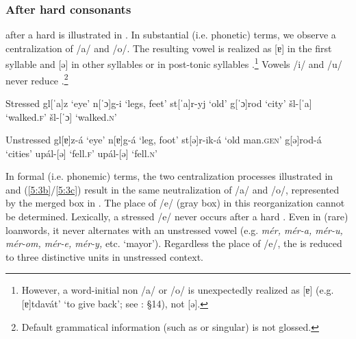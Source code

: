 \documentclass[output=paper,modfonts,newtxmath,hidelinks,]{langscibook}
\begin{document}
\subsubsection{After hard consonants}\label{5:s2.1.1}

  after a hard  is illustrated in . In substantial (i.e. phonetic) terms, we observe a centralization of /a/ and /o/. The resulting vowel is realized as [ɐ] in the first  syllable  and [ə] in other  syllables  or in post-tonic syllables .\footnote{However, a word-initial non  /a/ or /o/ is unexpectedly realized as [ɐ] (e.g. [ɐ]tdavát’ ‘to give back’; see \citealt{Avanesov1968}: §14), not [ə].} Vowels /i/ and /u/ never reduce \citep[38--42]{Avanesov1968}.\footnote{Default grammatical information (such as  or singular) is not glossed.}\vspace{-\baselineskip}

\ea\label{5:3}\begin{multicols}{2}
\begin{xlist}
\exi{} {Stressed}
\ex gl[ˈa]z \tabto{2.1cm}‘eye’\label{5:3a}
\exi{} n[ˈɔ]g-i \tabto{2.1cm}‘legs, feet’
\ex st[ˈa]r-yj \tabto{2.1cm}‘old’\label{5:3b}
\exi{} g[ˈɔ]rod \tabto{2.1cm}‘city’
\ex šl-[ˈa] \tabto{2.1cm}‘walked.\textsc{f}’\label{5:3c}
\exi{} šl-[ˈɔ] \tabto{2.1cm}‘walked.\textsc{n}’
\end{xlist}\columnbreak
\begin{xlist}
\exi{} {Unstressed}
\exi{} gl[ɐ]z-á \tabto{2.1cm}‘eye’
\exi{} n[ɐ]g-á \tabto{2.1cm}‘leg, foot’
\exi{} st[ə]r-ik-á \tabto{2.1cm}‘old man.\textsc{gen}’
\exi{} g[ə]rod-á \tabto{2.1cm}‘cities’
\exi{} upál-[ə] \tabto{2.1cm}‘fell.\textsc{f}’ 
\exi{} upál-[ə] \tabto{2.1cm}‘fell.\textsc{n}’
\end{xlist}
\end{multicols}
\z

In formal (i.e. phonemic) terms, the two centralization processes illustrated in  and (\ref{5:3b}/\ref{5:3c}) result in the same neutralization of /a/ and /o/, represented by the merged box in . The place of /e/ (gray box) in this reorganization cannot be determined. Lexically, a stressed /e/ never occurs after a hard  \citep[§103]{Garde1998}. Even in (rare) loanwords, it never alternates with an unstressed vowel (e.g. \textit{mér, mér-a, mér-u, mér-om, mér-e, mér-y,} etc. ‘mayor’). Regardless the place of /e/, the   is reduced to three distinctive units in unstressed context.\largerpage[-2]
\end{document}
